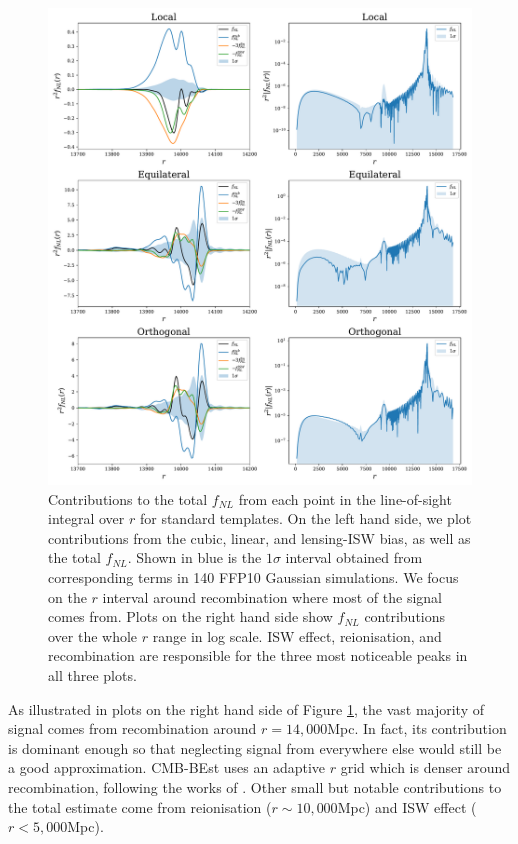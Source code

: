 \begin{figure}[htbp!] 
	\centering    
	\includegraphics[width=\textwidth]{trio_r_dependence.pdf}
	\caption{Contributions to the total $f_{NL}$ from each point in the line-of-sight integral over $r$ for standard templates. On the left hand side, we plot contributions from the cubic, linear, and lensing-ISW bias, as well as the total $f_{NL}$. Shown in blue is the $1\sigma$ interval obtained from corresponding terms in 140 FFP10 Gaussian simulations. We focus on the $r$ interval around recombination where most of the signal comes from. Plots on the right hand side show $f_{NL}$ contributions over the whole $r$ range in log scale. ISW effect, reionisation, and recombination are responsible for the three most noticeable peaks in all three plots.}
	\label{fig:trio_r_dependence}
\end{figure}

As illustrated in plots on the right hand side of Figure \ref{fig:trio_r_dependence}, the vast majority of signal comes from recombination around $r = 14,000$Mpc. In fact, its contribution is dominant enough so that neglecting signal from everywhere else would still be a good approximation. CMB-BEst uses an adaptive $r$ grid which is denser around recombination, following the works of \cite{Smith2011}. Other small but notable contributions to the total estimate come from reionisation ($r \sim 10,000$Mpc) and ISW effect ($r < 5,000$Mpc).

